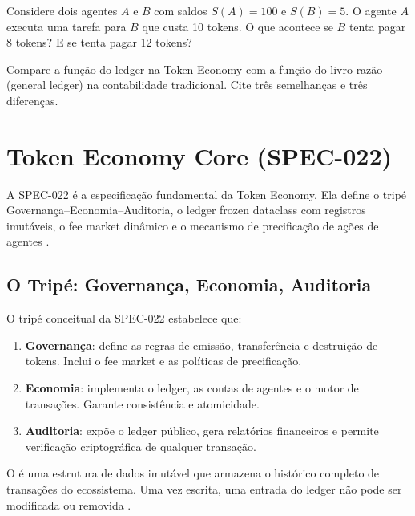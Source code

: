 \begin{exercicio}
Considere dois agentes $A$ e $B$ com saldos $S(A)=100$ e
$S(B)=5$. O agente $A$ executa uma tarefa para $B$ que custa
10 tokens. O que acontece se $B$ tenta pagar 8 tokens? E se
tenta pagar 12 tokens?
\end{exercicio}

\begin{exercicio}
Compare a função do ledger na Token Economy com a função do
livro-razão (general ledger) na contabilidade tradicional.
Cite três semelhanças e três diferenças.
\end{exercicio}

\section{Token Economy Core (SPEC-022)}
\label{sec:token-economy-core}
\nivelintermediario

A SPEC-022 é a especificação fundamental da Token Economy.
Ela define o tripé Governança--Economia--Auditoria, o ledger
frozen dataclass com registros imutáveis, o fee market dinâmico
e o mecanismo de precificação de ações de agentes
\cite{opencode2026token}.

\subsection{O Tripé: Governança, Economia, Auditoria}

O tripé conceitual da SPEC-022 estabelece que:

\begin{enumerate}
\item \textbf{Governança}: define as regras de emissão,
transferência e destruição de tokens. Inclui o fee market e as
políticas de precificação.
\item \textbf{Economia}: implementa o ledger, as contas de
agentes e o motor de transações. Garante consistência e
atomicidade.
\item \textbf{Auditoria}: expõe o ledger público, gera relatórios
financeiros e permite verificação criptográfica de qualquer
transação.
\end{enumerate}

\begin{definicao}
O  é uma estrutura de dados imutável que
armazena o histórico completo de transações do ecossistema. Uma
vez escrita, uma entrada do ledger não pode ser modificada ou
removida \cite{opencode2026token, nakamoto2008bitcoin}.
\end{definicao}


